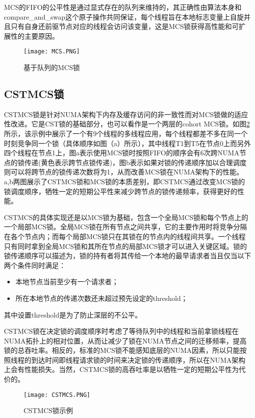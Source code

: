 MCS的FIFO的公平性是通过显式存在的队列来维持的，其正确性由算法本身和compare\_and\_swap这个原子操作共同保证，每个线程旨在本地标志变量上自旋并且只有自身还前驱节点对应的线程会访问该变量，这是MCS锁获得高性能和可扩展性的主要原因。
\begin{figure}[t]
	\centering
	\texttt{[image: MCS.PNG]}
	\caption{基于队列的MCS锁}
	\label{Fig:MCS}
\end{figure}

\subsection{CSTMCS锁}
CSTMCS锁是针对NUMA架构下内存及缓存访问的非一致性而对MCS锁做的适应性改进。它是CST锁的基础部分，也可以看作是一个两层的cohort MCS锁。如图\ref{Fig:CSTMCS}所示，该示例中展示了一个有9个线程的多线程应用，每个线程都差不多在同一个时刻竞争同一个锁（具体顺序如图（a）所示），其中线程T1到T5在节点0上而另外四个线程在节点1上，图a表示使用MCS锁时按照FIFO的顺序会有6次跨NUMA节点的锁传递(黄色表示跨节点锁传递)，图b表示如果对锁的传递顺序加以合理调度则可以将跨节点的锁传递次数将为1，从而改善MCS锁在NUMA架构下的性能。a,b两图展示了CSTMCS锁和MCS锁的本质差别，即CSTMCS通过改变MCS锁的锁调度顺序，牺牲一定的短期公平性来减少跨节点的锁传递频率，获得更好的性能。

CSTMCS的具体实现还是以MCS锁为基础，包含一个全局MCS锁和每个节点上的一个局部MCS锁。全局MCS锁在所有节点之间共享，它的主要作用时将竞争分隔在各个节点内；而每个局部MCS锁只在其锁在的节点内的线程间共享。一个线程只有同时拿到全局MCS锁和其所在节点的局部MCS锁才可以进入关键区域。锁的锁传递顺序可以描述为，锁的持有者将其传给一个本地的最早请求者当且仅当以下两个条件同时满足：
\begin{itemize}
\item  本地节点当前至少有一个请求者；
\item  所在本地节点的传递次数还未超过预先设定的threshold；
\end{itemize}
其中设置threshold是为了防止深层的不公平。

CSTMCS锁在决定锁的调度顺序时考虑了等待队列中的线程和当前拿锁线程在NUMA拓扑上的相对位置，从而让减少了锁在NUMA节点之间的迁移频率，提高锁的总吞吐率。相反的，标准的MCS锁不能感知底层的NUMA因素，所以只能按照线程的到达时间即线程请求锁的时间来决定锁的传递顺序，所以在NUMA架构上会有性能损失。当然，CSTMCS锁的高吞吐率是以牺牲一定的短期公平性为代价的。
\begin{figure}[t]
	\centering
	\texttt{[image: CSTMCS.PNG]}
	\caption{CSTMCS锁示例}
	\label{Fig:CSTMCS}
\end{figure}

